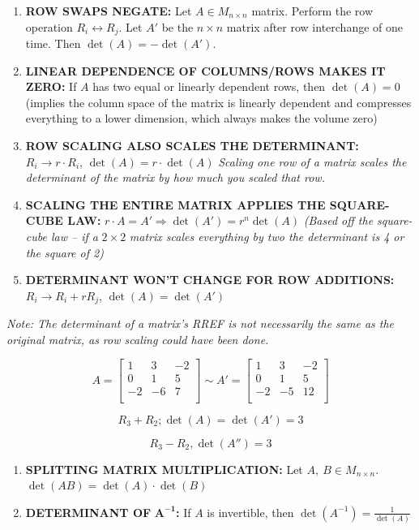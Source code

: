 \documentclass[12pt]{article}
\theoremstyle{plain}
\theoremstyle{remark}
\theoremstyle{definition}
\begin{document}
\begin{enumerate}
\def\labelenumi{\arabic{enumi}.}
\item
  \textbf{ROW SWAPS NEGATE:} Let \(A \in M_{n \times n}\) matrix.
  Perform the row operation \(R_{i} \leftrightarrow R_{j}\). Let \(A'\)
  be the \(n \times n\) matrix after row interchange of one time. Then
  \(\det(A) = - \det\left( A' \right)\).
\item
  \textbf{LINEAR DEPENDENCE OF COLUMNS/ROWS MAKES IT ZERO:} If \(A\) has
  two equal or linearly dependent rows, then \(\det(A) = 0\) (implies
  the column space of the matrix is linearly dependent and compresses
  everything to a lower dimension, which always makes the volume zero)
\item
  \textbf{ROW SCALING ALSO SCALES THE DETERMINANT:}
  \(R_{i} \rightarrow r \cdot R_{i}\), \(\det(A) = r \cdot \det(A)\)
  \emph{Scaling one row of a matrix scales the determinant of the matrix
  by how much you scaled that row.}
\item
  \textbf{SCALING THE ENTIRE MATRIX APPLIES THE SQUARE-CUBE LAW:}
  \(r \cdot A = A' \Rightarrow \det\left( A' \right) = r^{n}\det(A)\)
  \emph{(Based off the square-cube law -- if a} \(2 \times 2\)
  \emph{matrix scales everything by two the determinant is 4 or the
  square of 2)}
\item
  \textbf{DETERMINANT WON'T CHANGE FOR ROW ADDITIONS:}
  \(R_{i} \rightarrow R_{i} + rR_{j}\),
  \(\det(A) = \det\left( A' \right)\)
\end{enumerate}

\emph{Note: The determinant of a matrix's RREF is not necessarily the
same as the original matrix, as row scaling could have been done.}

\[A = \begin{bmatrix}
1 & 3 & - 2 \\
0 & 1 & 5 \\
 - 2 & - 6 & 7 \\
\end{bmatrix}\sim A' = \begin{bmatrix}
1 & 3 & - 2 \\
0 & 1 & 5 \\
 - 2 & - 5 & 12 \\
\end{bmatrix}\]

\[R_{3} + R_{2};\det(A) = \det\left( A' \right) = 3\]

\[R_{3} - R_{2},\det\left( A'' \right) = 3\]

\begin{enumerate}
\def\labelenumi{\arabic{enumi}.}
\setcounter{enumi}{5}
\item
  \textbf{SPLITTING MATRIX MULTIPLICATION:} Let
  \(A,\ B \in M_{n \times n}\).
  \(\det\left( AB \right) = \det(A) \cdot \det(B)\)
\item
  \textbf{DETERMINANT OF} \(\mathbf{A}^{\mathbf{- 1}}\)\textbf{:} If
  \(A\) is invertible, then
  \(\det\left( A^{- 1} \right) = \frac{1}{\det(A)}\)
\end{enumerate}
\end{document}
